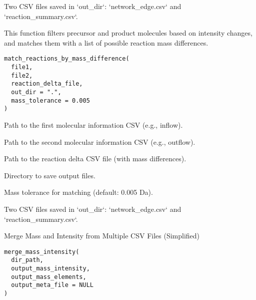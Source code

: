 \documentclass[a4paper]{book}
\begin{document}
%
\begin{Value}
Two CSV files saved in `out\_dir`: `network\_edge.csv` and `reaction\_summary.csv`.
\end{Value}
%
\begin{Description}
This function filters precursor and product molecules based on intensity changes,
and matches them with a list of possible reaction mass differences.
\end{Description}
%
\begin{Usage}
\begin{verbatim}
match_reactions_by_mass_difference(
  file1,
  file2,
  reaction_delta_file,
  out_dir = ".",
  mass_tolerance = 0.005
)
\end{verbatim}
\end{Usage}
%
\begin{Arguments}
\begin{ldescription}
\item[\code{file1}] Path to the first molecular information CSV (e.g., inflow).

\item[\code{file2}] Path to the second molecular information CSV (e.g., outflow).

\item[\code{reaction\_delta\_file}] Path to the reaction delta CSV file (with mass differences).

\item[\code{out\_dir}] Directory to save output files.

\item[\code{mass\_tolerance}] Mass tolerance for matching (default: 0.005 Da).
\end{ldescription}
\end{Arguments}
%
\begin{Value}
Two CSV files saved in `out\_dir`: `network\_edge.csv` and `reaction\_summary.csv`.
\end{Value}
%
\begin{Description}
Merge Mass and Intensity from Multiple CSV Files (Simplified)
\end{Description}
%
\begin{Usage}
\begin{verbatim}
merge_mass_intensity(
  dir_path,
  output_mass_intensity,
  output_mass_elements,
  output_meta_file = NULL
)
\end{verbatim}
\end{Usage}
\end{document}
